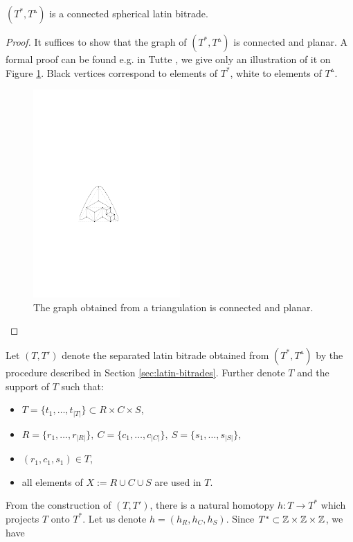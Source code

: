 \begin{lem}
$(T^*, T^\vartriangle)$ is a connected spherical latin bitrade.
\end{lem}
\begin{proof}
It suffices to show that the graph of $(T^*, T^\vartriangle)$ is connected and planar. A formal proof can be found e.g. in Tutte \cite{Tutte48}, we give only an illustration of it on Figure \ref{fig:triangulation-graph}. Black vertices correspond to elements of $T^*$, white to elements of $T^\vartriangle$.

\begin{figure}[htb]
\centering
\includegraphics[width=0.5\textwidth]{img/triangulation_graph.pdf}
\caption{The graph obtained from a triangulation is connected and planar.}
\label{fig:triangulation-graph}
\end{figure}
\end{proof}

Let $(T,T')$ denote the separated latin bitrade obtained from $(T^*, T^\vartriangle)$ by the procedure described in Section \ref{sec:latin-bitrades}. Further denote $T$ and the support of $T$ such that:
\begin{itemize}
	\item $T = \{t_1, \dots, t_{|T|}\} \subset R \times C \times S$,
	\item $R = \{r_1,\dots,r_{|R|}\},\ 
		C = \{c_1,\dots,c_{|C|}\},\ 
		S = \{s_1,\dots,s_{|S|}\}$,
	\item $(r_1,c_1,s_1) \in T$,
	\item all elements of $X := R \cup C \cup S$ are used in $T$.
\end{itemize}%
From the construction of $(T,T')$, there is a natural homotopy $h:T \rightarrow T^*$ which projects $T$ onto $T^*$. Let us denote $h = (h_R, h_C, h_S)$. Since $T^* \subset \mathbb Z \times \mathbb Z \times \mathbb Z$, we have
\cosyalign{
	h_R: R \rightarrow \Z,\ h_C: C \rightarrow \Z,\ h_S: S \rightarrow \Z.
}%

